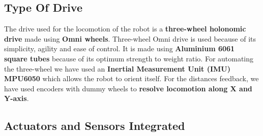 
    \subsection{Type Of Drive}
        The drive used for the locomotion of the robot is a \textbf{three-wheel holonomic drive} made using \textbf{Omni wheels}. Three-wheel Omni drive is 
        used because of its simplicity, agility and ease of control. It is made using \textbf{Aluminium 6061 square tubes} because of its optimum 
        strength to weight ratio. For automating the three-wheel we have used an \textbf{Inertial Measurement Unit (IMU) MPU6050} which allows 
        the robot to orient itself. For the distances feedback, we have used encoders with dummy wheels to \textbf{resolve locomotion along X and 
        Y-axis}.



    \subsection{Actuators and Sensors Integrated}

